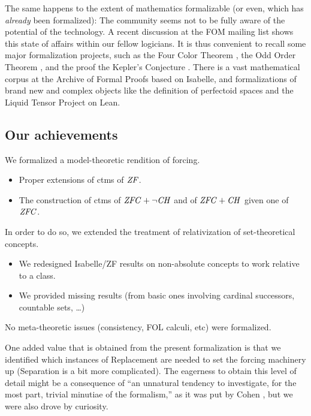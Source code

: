 The same happens to the extent of mathematics formalizable (or even,
which has \emph{already} been formalized): The community seems not to
be fully aware of the potential of the technology. A recent discussion
at the FOM mailing list shows this state of affairs within our fellow
logicians. It is thus convenient to recall
some major formalization projects, such as the Four Color Theorem
\cite{MR2463991}, the Odd Order Theorem
\cite{10.1007/978-3-642-39634-2_14}, and the proof the Kepler's
Conjecture \cite{MR3659768}. There is a vast mathematical corpus at
the Archive of Formal Proofs based on Isabelle, and formalizations of
brand new and complex objects like the definition of perfectoid spaces
and the Liquid Tensor Project \cite{LTE2020,LTE2021} on Lean.

\subsection{Our achievements}
We formalized a model-theoretic rendition of forcing.
\begin{itemize}
\item Proper extensions of ctms of $\mathit{ZF}$.
\item The construction of ctms of $\mathit{ZFC} + \neg\mathit{CH}$ and of $\mathit{ZFC} + \mathit{CH}$ given one of
  $\mathit{ZFC}$.
\end{itemize}

In order to do so, we extended the treatment of relativization of
set-theoretical concepts. 
\begin{itemize}
\item We redesigned Isabelle/ZF results on non-absolute concepts to work
  relative to a class.
\item We provided missing results (from basic ones involving cardinal
  successors, countable sets, \dots)
\end{itemize}
No meta-theoretic issues (consistency, FOL calculi, etc) were formalized.

One added value that is obtained from the present formalization is
that we identified which instances of  Replacement are
needed to set the forcing machinery up (Separation is a bit more
complicated).
The eagerness to obtain this level of detail might be a consequence of
“an unnatural tendency to investigate, for the most part, trivial
minutiae of the formalism,” as it was put by Cohen
\cite{zbMATH02012060}, but we were also drove by curiosity.

